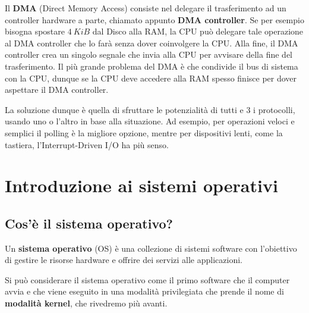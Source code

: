 \documentclass[11pt, a4paper, titlepage, oneside]{scrbook}
\begin{document}
Il \textbf{DMA} (Direct Memory Access) consiste nel delegare il trasferimento ad un controller hardware a parte, chiamato appunto \textbf{DMA controller}. Se per esempio bisogna spostare $\SI{4}{KiB}$ dal Disco alla RAM, la CPU può delegare tale operazione al DMA controller che lo farà senza dover coinvolgere la CPU. Alla fine, il DMA controller crea un singolo segnale che invia alla CPU per avvisare della fine del trasferimento. Il più grande problema del DMA è che condivide il bus di sistema con la CPU, dunque se la CPU deve accedere alla RAM spesso finisce per dover aspettare il DMA controller. 

La soluzione dunque è quella di sfruttare le potenzialità di tutti e 3 i protocolli, usando uno o l'altro in base alla situazione. Ad esempio, per operazioni veloci e semplici il polling è la migliore opzione, mentre per dispositivi lenti, come la tastiera, l'Interrupt-Driven I/O ha più senso. 

\section{Introduzione ai sistemi operativi}

\subsection{Cos'è il sistema operativo?}

\begin{Definizione}
\label{def-sistema-operativo}
Un \textbf{sistema operativo} (OS) è una collezione di sistemi software con l'obiettivo di gestire le risorse hardware e offrire dei servizi alle applicazioni.
\end{Definizione}

Si può considerare il sistema operativo come il primo software che il computer avvia e che viene eseguito in una modalità privilegiata che prende il nome di \textbf{modalità kernel}, che rivedremo più avanti.
\end{document}
